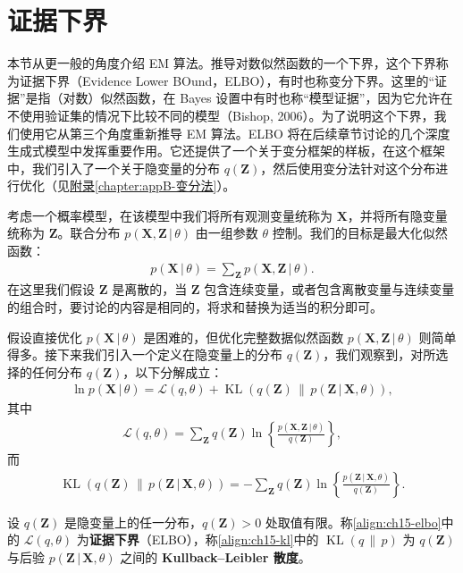 \documentclass[../../main.tex]{subfiles}
\begin{document}
\section{证据下界}\label{section:ch15-证据下界}

本节从更一般的角度介绍 EM 算法。推导对数似然函数的一个下界，这个下界称为证据下界（Evidence Lower BOund，ELBO），有时也称变分下界。这里的“证据”是指（对数）似然函数，在 Bayes 设置中有时也称“模型证据”，因为它允许在不使用验证集的情况下比较不同的模型（Bishop, 2006）。为了说明这个下界，我们使用它从第三个角度重新推导 EM 算法。ELBO 将在后续章节讨论的几个深度生成式模型中发挥重要作用。它还提供了一个关于变分框架的样板，在这个框架中，我们引入了一个关于隐变量的分布 $q(\bm{Z})$，然后使用变分法针对这个分布进行优化（见\hyperref[chapter:appB-变分法]{附录\ref*{chapter:appB-变分法}}）。

考虑一个概率模型，在该模型中我们将所有观测变量统称为 $\bm{X}$，并将所有隐变量统称为 $\bm{Z}$。联合分布 $p(\bm{X},\bm{Z}\,|\,\theta)$ 由一组参数 $\theta$ 控制。我们的目标是最大化似然函数：
\begin{align}
p(\bm{X}\,|\,\theta)=\sum_{\bm{Z}}p(\bm{X},\bm{Z}\,|\,\theta).
\label{align:ch15-evidence}
\end{align}
在这里我们假设 $\bm{Z}$ 是离散的，当 $\bm{Z}$ 包含连续变量，或者包含离散变量与连续变量的组合时，要讨论的内容是相同的，将求和替换为适当的积分即可。

假设直接优化 $p(\bm{X}\,|\,\theta)$ 是困难的，但优化完整数据似然函数 $p(\bm{X},\bm{Z}\,|\,\theta)$ 则简单得多。接下来我们引入一个定义在隐变量上的分布 $q(\bm{Z})$，我们观察到，对所选择的任何分布 $q(\bm{Z})$，以下分解成立：
\begin{align}
\ln p(\bm{X}\,|\,\theta)=\mathcal{L}(q,\theta)+\operatorname{KL}\!\left(q(\bm{Z})\,\|\,p(\bm{Z}\,|\,\bm{X},\theta)\right),
\label{align:ch15-elbo-decomp}
\end{align}
其中
\begin{align}
\mathcal{L}(q,\theta)=\sum_{\bm{Z}}q(\bm{Z})\ln\!\left\{\frac{p(\bm{X},\bm{Z}\,|\,\theta)}{q(\bm{Z})}\right\},
\label{align:ch15-elbo}
\end{align}
而
\begin{align}
\operatorname{KL}\!\left(q(\bm{Z})\,\|\,p(\bm{Z}\,|\,\bm{X},\theta)\right)=-\sum_{\bm{Z}}q(\bm{Z})\ln\!\left\{\frac{p(\bm{Z}\,|\,\bm{X},\theta)}{q(\bm{Z})}\right\}.
\label{align:ch15-kl}
\end{align}

\begin{definition}\label{definition:ch15-证据下界}
设 $q(\bm{Z})$ 是隐变量上的任一分布，$q(\bm{Z})>0$ 处取值有限。称\eqref{align:ch15-elbo}中的 $\mathcal{L}(q,\theta)$ 为\textbf{证据下界}（ELBO），称\eqref{align:ch15-kl}中的 $\operatorname{KL}\!\left(q\,\|\,p\right)$ 为 $q(\bm{Z})$ 与后验 $p(\bm{Z}\,|\,\bm{X},\theta)$ 之间的 \textbf{Kullback--Leibler 散度}。
\end{definition}
\end{document}
